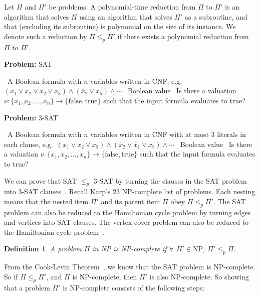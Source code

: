 \documentclass{amsart}
\newcommand{\ov}{\overline}
\theoremstyle{plain}
\newcounter{dummy-def}\numberwithin{dummy-def}{section}
\newtheorem{definition}[dummy-def]{Definition}
\newcounter{dummy-prop}\numberwithin{dummy-prop}{section}
\newcounter{dummy-corollary}\numberwithin{dummy-corollary}{section}
\newcounter{dummy-ex}\numberwithin{dummy-ex}{section}
\newcounter{dummy-eg}\numberwithin{dummy-eg}{section}
\newcommand{\np}{\text{NP}}
\newcommand{\true}{\text{true}}
\newcommand{\false}{\text{false}}
\begin{document}
Let $\Pi$ and $\Pi'$ be problems. A polynomial-time reduction from $\Pi$ to $\Pi'$ is an algorithm
that solves $\Pi$ using an algorithm that solves $\Pi'$ as a subroutine, and that (excluding its
subroutine) is polynomial on the size of its instance. We denote such a reduction by
$\Pi\leq_p\Pi'$ if there exists a polynomial reduction from $\Pi$ to $\Pi'$.

\begin{algorithm}[h]
  \caption*{\textbf{Problem:} SAT}
  \begin{algorithmic}[1]
    \Require\, A Boolean formula with $n$ variables written in CNF, e.g.\ $(x_1\vee x_2\vee x_2\vee
    x_3)\wedge (\ov{x}_2\vee x_5)\wedge\cdots$
    \Ensure\, Boolean value
    \Description\, Is there a valuation $\nu :\{x_1,x_2,\ldots,x_n\}\to\{\false, \true\}$ such that the
    input formula evaluates to true?
  \end{algorithmic}
\end{algorithm}

\begin{algorithm}[h]
  \caption*{\textbf{Problem:} 3-SAT}
  \begin{algorithmic}[1]
    \Require\, A Boolean formula with $n$ variables written in CNF with at most 3 literals in each
    clause, e.g.\ $(x_1\vee x_2\vee x_3)\wedge(\ov{x}_2\vee\ov{x}_1\vee x_5) \wedge\cdots$
    \Ensure\, Boolean value
    \Description\, Is there a valuation $\nu :\{x_1,x_2,\ldots,x_n\}\to\{\false, \true\}$ such that the
    input formula evaluates to true?
  \end{algorithmic}
\end{algorithm}

We can prove that SAT $\leq_p$ 3-SAT by turning the clauses in the SAT problem into 3-SAT
clauses~\cite{karp}. Recall Karp's 23 NP-complete list of problems. Each nesting means that the
nested item $\Pi'$ and its parent item $\Pi$ obey $\Pi\leq_p\Pi'$. The SAT problem can also be
reduced to the Hamiltonian cycle problem by turning edges and vertices into SAT clauses. The vertex
cover problem can also be reduced to the Hamiltonian cycle problem~\cite{karp}.

\begin{definition} A problem $\Pi$ in NP is NP-complete if $\forall$ $\Pi' \in \np$,
  $\Pi'\leq_p\Pi$.
\end{definition}

From the Cook-Levin Theorem~\cite{cook,levin}, we know that the SAT problem is NP-complete. So if
$\Pi\leq_p\Pi'$, and $\Pi$ is NP-complete, then $\Pi'$ is also NP-complete. So showing that a
problem $\Pi'$ is NP-complete consists of the following steps:
\end{document}
